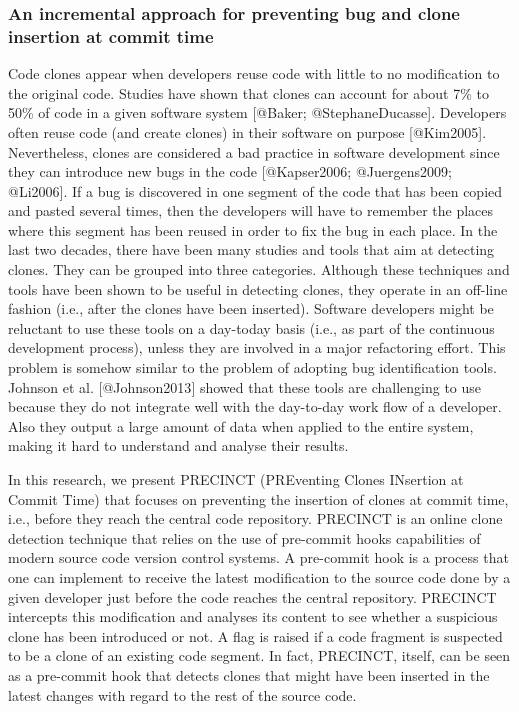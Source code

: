 \subsubsection{An incremental approach for preventing bug and clone
insertion at commit
time}\label{an-incremental-approach-for-preventing-bug-and-clone-insertion-at-commit-time}

Code clones appear when developers reuse code with little to no
modification to the original code. Studies have shown that clones can
account for about 7\% to 50\% of code in a given software system
{[}@Baker; @StephaneDucasse{]}. Developers often reuse code (and create
clones) in their software on purpose {[}@Kim2005{]}. Nevertheless,
clones are considered a bad practice in software development since they
can introduce new bugs in the code {[}@Kapser2006; @Juergens2009;
@Li2006{]}. If a bug is discovered in one segment of the code that has
been copied and pasted several times, then the developers will have to
remember the places where this segment has been reused in order to fix
the bug in each place. In the last two decades, there have been many
studies and tools that aim at detecting clones. They can be grouped into
three categories. Although these techniques and tools have been shown to
be useful in detecting clones, they operate in an off-line fashion
(i.e., after the clones have been inserted). Software developers might
be reluctant to use these tools on a day-today basis (i.e., as part of
the continuous development process), unless they are involved in a major
refactoring effort. This problem is somehow similar to the problem of
adopting bug identification tools. Johnson et al. {[}@Johnson2013{]}
showed that these tools are challenging to use because they do not
integrate well with the day-to-day work flow of a developer. Also they
output a large amount of data when applied to the entire system, making
it hard to understand and analyse their results.

In this research, we present PRECINCT (PREventing Clones INsertion at
Commit Time) that focuses on preventing the insertion of clones at
commit time, i.e., before they reach the central code repository.
PRECINCT is an online clone detection technique that relies on the use
of pre-commit hooks capabilities of modern source code version control
systems. A pre-commit hook is a process that one can implement to
receive the latest modification to the source code done by a given
developer just before the code reaches the central repository. PRECINCT
intercepts this modification and analyses its content to see whether a
suspicious clone has been introduced or not. A flag is raised if a code
fragment is suspected to be a clone of an existing code segment. In
fact, PRECINCT, itself, can be seen as a pre-commit hook that detects
clones that might have been inserted in the latest changes with regard
to the rest of the source code.

